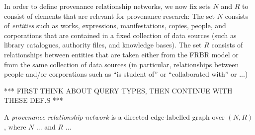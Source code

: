 \documentclass[11pt,DIV=11,a4paper,BCOR15mm,twoside=on]{scrreprt}
\begin{document}
  In order to define provenance relationship networks, we now fix sets $N$ and $R$ to consist
  of elements that are relevant for provenance research:
  The set $N$ consists of \emph{entities} such as 
  works, expressions, manifestations, copies, people, and corporations
  that are contained in a fixed collection of data sources (such as library catalogues,
  authority files, and knowledge bases). The set $R$ consists of relationships
  between entities that are taken either from the FRBR model
  or from the same collection of data sources (in particular, relationships between people and/or corporations
  such as ``is student of'' or ``collaborated with'' or ...)
  
  *** FIRST THINK ABOUT QUERY TYPES, THEN CONTINUE WITH THESE DEF.S ***
  
  
  A \emph{provenance relationship network} is a directed edge-labelled graph over $(N,R)$,
  where $N$ ... and $R$ ... 
  
     


%  
%  
\end{document}
